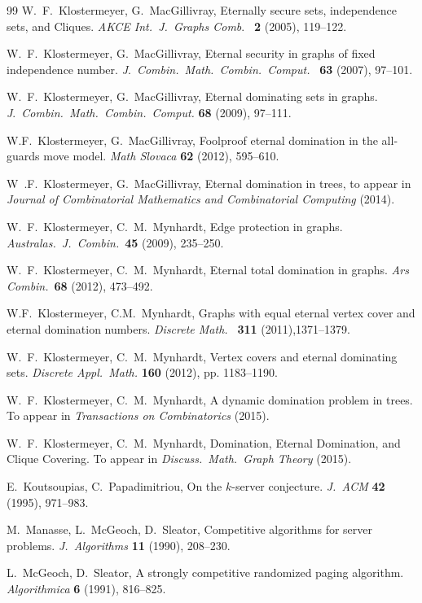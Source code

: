 \documentclass[12pt]{article}%
\begin{document}
\begin{thebibliography}{99}
W.~F.~Klostermeyer, G.~MacGillivray, Eternally secure sets,
independence sets, and Cliques. \emph{AKCE Int.~J.~Graphs Comb}.\emph{~}%
\textbf{{2}} (2005), 119--122.

W.~F.~Klostermeyer, G.~MacGillivray, Eternal security in graphs
of fixed independence number. \emph{J}.~\emph{Combin.~Math.~Combin.~Comput.}%
~\textbf{63} (2007), 97--101.

W.~F.~Klostermeyer, G.~MacGillivray, Eternal dominating sets in
graphs. \emph{J}.~\emph{Combin.~Math.~Combin.~Comput.} \textbf{68} (2009), 97--111.

W.F.~Klostermeyer, G.~MacGillivray, Foolproof eternal
domination in the all-guards move model. \emph{Math Slovaca} \textbf{62}
(2012), 595--610.

W~.F.~Klostermeyer, G.~MacGillivray, Eternal domination in
trees, to appear in \textit{Journal of Combinatorial Mathematics and
Combinatorial Computing} (2014).

W.~F.~Klostermeyer, C.~M.~Mynhardt, Edge protection in graphs.
\emph{Australas.~J.~Combin.}~\textbf{45} (2009), 235--250.

W.~F.~Klostermeyer, C.~M.~Mynhardt, Eternal total domination in
graphs. \emph{Ars Combin.}~\textbf{68} (2012), 473--492.

W.F.~Klostermeyer, C.M.~Mynhardt, Graphs with equal eternal
vertex cover and eternal domination numbers. \emph{Discrete Math.~}%
\textbf{311} (2011),1371--1379.

W.~F.~Klostermeyer, C.~M.~Mynhardt, Vertex covers and eternal
dominating sets. \emph{Discrete Appl.~Math.} \textbf{160} (2012), pp. 1183--1190.

W.~F.~Klostermeyer, C.~M.~Mynhardt, A dynamic domination problem
in trees. To appear in \emph{Transactions on Combinatorics} (2015).

W.~F.~Klostermeyer, C.~M.~Mynhardt, Domination, Eternal
Domination, and Clique Covering. To appear in \emph{Discuss.~Math.~Graph
Theory} (2015).

E.~Koutsoupias, C.~Papadimitriou, On the $k$-server conjecture.
\emph{J.~ACM} \textbf{{42}} (1995), 971--983.

M.~Manasse, L.~McGeoch, D.~Sleator, Competitive algorithms for
server problems. \emph{J.~Algorithms} \textbf{{11}} (1990), 208--230.

L.~McGeoch, D.~Sleator, A strongly competitive randomized paging
algorithm. \emph{Algorithmica} \textbf{{6}} (1991), 816--825.


\end{thebibliography}
\end{document}
